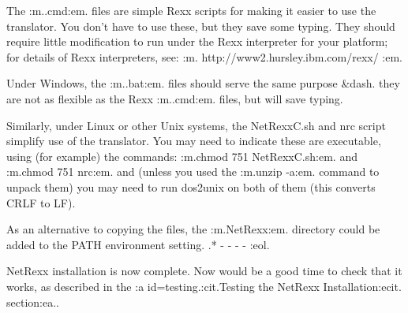 The :m..cmd:em. files are simple Rexx scripts for making it easier to
use the translator.  You don't have to use these, but they save some
typing.  They should require little modification to run under the Rexx
interpreter for your platform; for details of Rexx interpreters,
see: :m.
http://www2.hursley.ibm.com/rexx/
:em.

Under Windows, the :m..bat:em. files should serve the same
purpose &dash. they are not as flexible as the Rexx :m..cmd:em. files,
but will save typing.

Similarly, under Linux or other Unix systems, the NetRexxC.sh and nrc
script simplify use of the translator.  You may need to indicate these
are executable, using (for example) the commands: :m.chmod 751
NetRexxC.sh:em. and :m.chmod 751 nrc:em. and (unless you used
the :m.unzip -a:em. command to unpack them) you may need to run dos2unix
on both of them (this converts CRLF to LF).

As an alternative to copying the files, the :m.NetRexx\bin:em. directory
could be added to the PATH environment setting.
.* - - - -
:eol.

NetRexx installation is now complete.  Now would be a good time to check
that it works, as described in the :a id=testing.:cit.Testing the NetRexx
Installation:ecit. section:ea..
